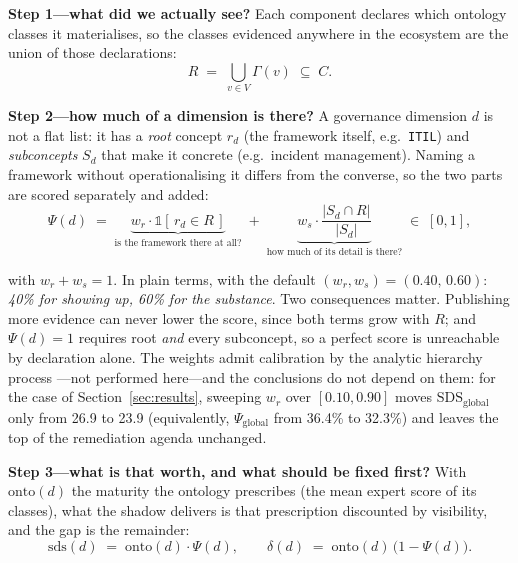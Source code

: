 \documentclass[engproc,proceedingpaper,submit,moreauthors]{Definitions/mdpi}
\begin{document}
    \textbf{Step 1---what did we actually see?} Each component declares which ontology classes it materialises, so the classes evidenced anywhere in the ecosystem are the union of those declarations:
\begin{equation}
R \;=\; \bigcup_{v \in V} \Gamma(v) \;\subseteq\; C .
\label{eq:coverage-set}
\end{equation}

    \textbf{Step 2---how much of a dimension is there?} A governance dimension $d$ is not a flat list: it has a \emph{root} concept $r_d$ (the framework itself, e.g.\ \texttt{ITIL}) and \emph{subconcepts} $S_d$ that make it concrete (e.g.\ incident management). Naming a framework without operationalising it differs from the converse, so the two parts are scored separately and added:
\begin{equation}
\Psi(d) \;=\; \underbrace{w_r \cdot \mathbb{1}\!\left[\, r_d \in R \,\right]}_{\text{is the framework there at all?}} \;+\; \underbrace{w_s \cdot \frac{\lvert S_d \cap R \rvert}{\lvert S_d \rvert}}_{\text{how much of its detail is there?}}\;\in\;[0,1],
\label{eq:psi}
\end{equation}

    with $w_r+w_s=1$. In plain terms, with the default $(w_r,w_s)=(0.40,\,0.60)$: \emph{40\% for showing up, 60\% for the substance}. Two consequences matter. Publishing more evidence can never lower the score, since both terms grow with $R$; and $\Psi(d)=1$ requires root \emph{and} every subconcept, so a perfect score is unreachable by declaration alone. The weights admit calibration by the analytic hierarchy process \cite{Saaty1990}---not performed here---and the conclusions do not depend on them: for the case of Section~\ref{sec:results}, sweeping $w_r$ over $[0.10,0.90]$ moves $\mathrm{SDS}_{\mathrm{global}}$ only from 26.9 to 23.9 (equivalently, $\Psi_{\mathrm{global}}$ from 36.4\% to 32.3\%) and leaves the top of the remediation agenda unchanged.

\textbf{Step 3---what is that worth, and what should be fixed first?} With $\mathrm{onto}(d)$ the maturity the ontology prescribes (the mean expert score of its classes), what the shadow delivers is that prescription discounted by visibility, and the gap is the remainder:
\begin{equation}
\mathrm{sds}(d) \;=\; \mathrm{onto}(d)\cdot\Psi(d),
\qquad
\delta(d) \;=\; \mathrm{onto}(d)\,\bigl(1-\Psi(d)\bigr).
\label{eq:delta}
\end{equation}
\end{document}
